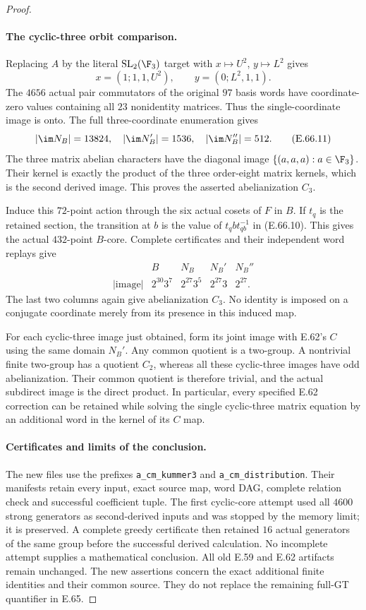 \begin{proof}
\paragraph{The cyclic-three orbit comparison.}
Replacing $A$ by the literal $\mathrm{SL}_2(\F_3)$ target
with $x\mapsto U^2$, $y\mapsto L^2$ gives
\[
 x=(1;1,1,U^2),\qquad y=(0;L^2,1,1).
 \tag{E.66.10}
\]
The $4656$ actual pair commutators of the original $97$ basis
words have coordinate-zero values containing all $23$
nonidentity matrices. Thus the single-coordinate image is
onto. The full three-coordinate enumeration gives
\[
 |\im N_B|=13824,\quad |\im N_B'|=1536,
 \quad |\im N_B''|=512.
 \tag{E.66.11}
\]
The three matrix abelian characters have the diagonal image
$\{(a,a,a):a\in\F_3\}$. Their kernel is exactly the product
of the three order-eight matrix kernels, which is the second
derived image. This proves the asserted abelianization $C_3$.

Induce this $72$-point action through the six actual cosets
of $F$ in $B$. If $t_q$ is the retained section, the transition
at $b$ is the value of $t_qbt_{qb}^{-1}$ in
\textup{(E.66.10)}. This gives the actual $432$-point
$B$-core. Complete certificates and their independent word
replays give
\[
\begin{array}{c|rrrr}
 &B&N_B&N_B'&N_B''\\\hline
 |\mathrm{image}|&2^{30}3^7&2^{27}3^5&2^{27}3&2^{27}.
\end{array}
 \tag{E.66.12}
\]
The last two columns again give abelianization $C_3$.
No identity is imposed on a conjugate coordinate merely from
its presence in this induced map.

For each cyclic-three image just obtained, form its joint
image with E.62's $C$ using the same domain $N_B'$.
Any common quotient is a two-group. A nontrivial finite
two-group has a quotient $C_2$, whereas all these cyclic-three
images have odd abelianization. Their common quotient is
therefore trivial, and the actual subdirect image is the
direct product. In particular, every specified E.62 correction
can be retained while solving the single cyclic-three matrix
equation by an additional word in the kernel of its $C$ map.

\paragraph{Certificates and limits of the conclusion.}
The new files use the prefixes \texttt{a\_cm\_kummer3} and
\texttt{a\_cm\_distribution}. Their manifests retain every
input, exact source map, word DAG, complete relation check and
successful coefficient tuple. The first cyclic-core attempt
used all $4600$ strong generators as second-derived inputs
and was stopped by the memory limit; it is preserved. A
complete greedy certificate then retained $16$ actual
generators of the same group before the successful derived
calculation. No incomplete attempt supplies a mathematical
conclusion. All old E.59 and E.62 artifacts remain unchanged.
The new assertions concern the exact additional finite
identities and their common source. They do not replace the
remaining full-GT quantifier in E.65.
\end{proof}
